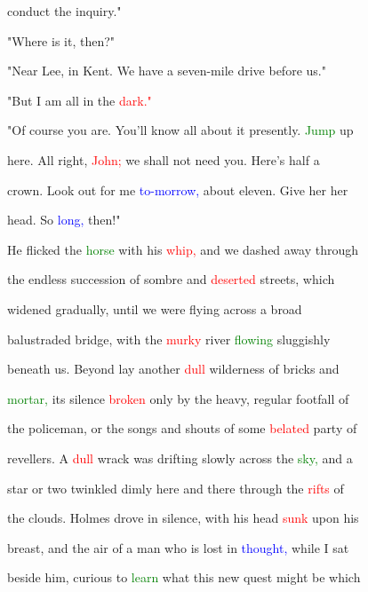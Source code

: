  conduct the \textcolor{BurntOrange}{inquiry."}



 "Where is it, then?"



 "Near Lee, in Kent. We have a seven-mile drive before us."



 "But I am all in the \textcolor{red}{dark."}



 "Of course you are. You'll know all about it presently. \textcolor{green}{Jump} up

 here. All right, \textcolor{red}{John;} we shall not need you. Here's half a

 crown. Look out for me \textcolor{blue}{to-morrow,} about eleven. Give her her

 head. So \textcolor{blue}{long,} then!"



 He flicked the \textcolor{green}{horse} with his \textcolor{red}{whip,} and we dashed away through

 the \textcolor{BurntOrange}{endless} succession of sombre and \textcolor{red}{deserted} streets, which

 widened gradually, until we were flying across a broad

 balustraded bridge, with the \textcolor{red}{murky} river \textcolor{green}{flowing} sluggishly

 beneath us. Beyond lay another \textcolor{red}{dull} \textcolor{BurntOrange}{wilderness} of bricks and

 \textcolor{green}{mortar,} its silence \textcolor{red}{broken} only by the heavy, regular footfall of

 the \textcolor{BurntOrange}{policeman,} or the songs and \textcolor{BurntOrange}{shouts} of some \textcolor{red}{belated} party of

 revellers. A \textcolor{red}{dull} wrack was drifting slowly across the \textcolor{green}{sky,} and a

 \textcolor{BurntOrange}{star} or two \textcolor{BurntOrange}{twinkled} dimly here and there through the \textcolor{red}{rifts} of

 the clouds. Holmes drove in silence, with his head \textcolor{red}{sunk} upon his

 breast, and the air of a man who is \textcolor{BurntOrange}{lost} in \textcolor{blue}{thought,} while I sat

 beside him, curious to \textcolor{green}{learn} what this new \textcolor{BurntOrange}{quest} might be which

